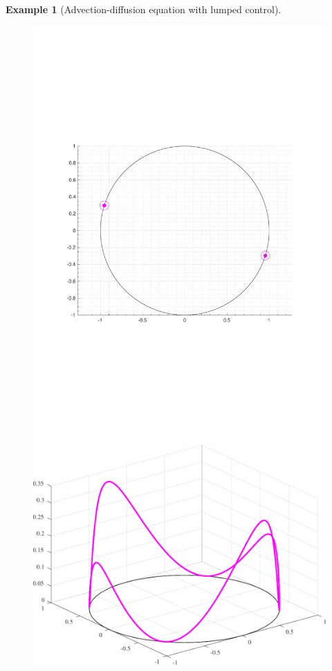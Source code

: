 \documentclass[journal,twoside,web]{ieeecolor}
\newtheorem{example}{Example}
\begin{document}
\begin{example}[Advection-diffusion equation with lumped control]
	\begin{figure}
	\includegraphics[scale=0.265]{figures/convect+-_opt}
	\hspace{0.1cm}
	\includegraphics[scale=0.265]{figures/convection_-+}
	\vspace{0.1cm}
	

\end{figure}
\end{example}
\end{document}
